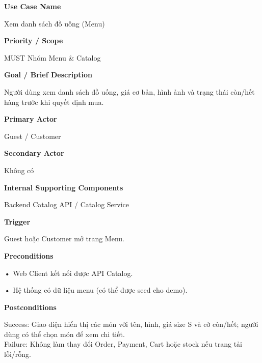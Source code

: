 \documentclass[11pt,a4paper,oneside]{report}
\begin{document}
\par\smallskip\noindent\textcolor{sgublue}{\textbf{Use Case Name}}\par\nobreak
Xem danh sách đồ uống (Menu)
\par

\par\smallskip\noindent\textcolor{sgublue}{\textbf{Priority / Scope}}\par\nobreak
MUST \textbar{} Nhóm Menu \& Catalog
\par

\par\smallskip\noindent\textcolor{sgublue}{\textbf{Goal / Brief Description}}\par\nobreak
Người dùng xem danh sách đồ uống, giá cơ bản, hình ảnh và trạng thái còn/hết hàng trước khi quyết định mua.
\par

\par\smallskip\noindent\textcolor{sgublue}{\textbf{Primary Actor}}\par\nobreak
Guest / Customer
\par

\par\smallskip\noindent\textcolor{sgublue}{\textbf{Secondary Actor}}\par\nobreak
Không có
\par

\par\smallskip\noindent\textcolor{sgublue}{\textbf{Internal Supporting Components}}\par\nobreak
Backend Catalog API / Catalog Service
\par

\par\smallskip\noindent\textcolor{sgublue}{\textbf{Trigger}}\par\nobreak
Guest hoặc Customer mở trang Menu.
\par

\par\smallskip\noindent\textcolor{sgublue}{\textbf{Preconditions}}\par\nobreak
\textbf{•} Web Client kết nối được API Catalog.

\textbf{•} Hệ thống có dữ liệu menu (có thể được seed cho demo).
\par

\par\smallskip\noindent\textcolor{sgublue}{\textbf{Postconditions}}\par\nobreak
Success: Giao diện hiển thị các món với tên, hình, giá size S và cờ còn/hết; người dùng có thể chọn món để xem chi tiết.\\
Failure: Không làm thay đổi Order, Payment, Cart hoặc stock nếu trang tải lỗi/rỗng.\strut
\par
\end{document}
